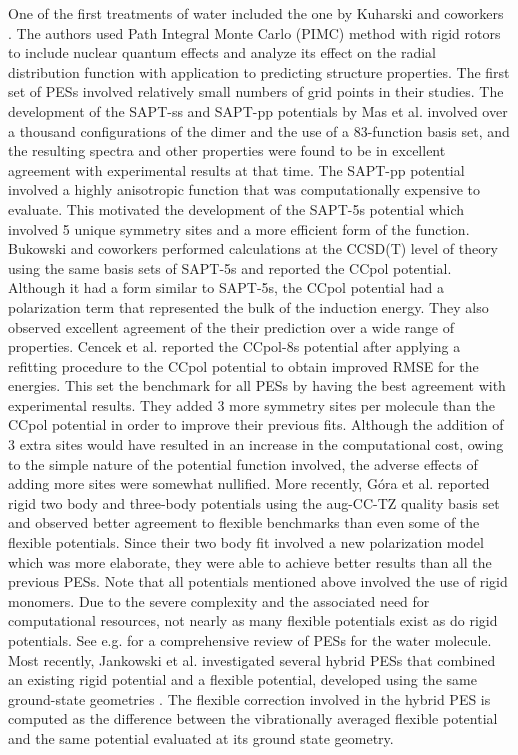         One of the first \abinitio{} treatments of water included the one by Kuharski and coworkers \cite{Kuharski1984,Kuharski1985}. The authors used Path Integral Monte Carlo (PIMC) method with rigid rotors to include nuclear quantum effects and analyze its effect on the radial distribution function with application to predicting structure properties. The first set of \abinitio{} PESs \cite{Popkie1973,Matsuoka1976,Niesar1989,Niesar1990,Corongiu1992,Millot1992,Millot1998} involved relatively small numbers of grid points in their studies. The development of the SAPT-ss and SAPT-pp potentials by Mas et al. \cite{Mas1997} involved over a thousand configurations of the dimer and the use of a 83-function basis set, and the resulting spectra and other properties were found to be in excellent agreement with experimental results at that time. The SAPT-pp potential involved a highly anisotropic function that was computationally expensive to evaluate. This motivated the development of the SAPT-5s potential which involved 5 unique symmetry sites and a more efficient form of the function. Bukowski and coworkers \cite{Bukowski2007,Bukowski2008a,Bukowski2008b} performed calculations at the CCSD(T) level of theory using the same basis sets of SAPT-5s and reported the CCpol potential. Although it had a form similar to SAPT-5s, the CCpol potential had a polarization term that represented the bulk of the induction energy. They also observed excellent agreement of the their prediction over a wide range of properties. Cencek et al. \cite{Cencek2008} reported the CCpol-8s potential after applying a refitting procedure to the CCpol potential to obtain improved RMSE for the \abinitio{} energies. This set the benchmark for all \abinitio{} PESs by having the best agreement with experimental results. They added 3 more symmetry sites per molecule than the CCpol potential in order to improve their previous fits. Although the addition of 3 extra sites would have resulted in an increase in the computational cost, owing to the simple nature of the potential function involved, the adverse effects of adding more sites were somewhat nullified. More recently, G\'{o}ra et al. \cite{Gora2014} reported rigid two body and three-body potentials using the aug-CC-TZ quality basis set and observed better agreement to flexible benchmarks than even some of the flexible potentials. Since their two body fit involved a new polarization model which was more elaborate, they were able to achieve better results than all the previous PESs. Note that all potentials mentioned above involved the use of rigid monomers. Due to the severe complexity and the associated need for computational resources, not nearly as many flexible \abinitio{} potentials  exist as do rigid potentials. See e.g. \cite{Szalewicz2009} for a comprehensive review of PESs for the water molecule. Most recently, Jankowski et al.\cite{Jankowski2015} investigated several hybrid PESs that combined an existing rigid potential and a flexible potential, developed using the same ground-state geometries \cite{Leforestier2002}. The flexible correction involved in the hybrid PES is computed as the difference between the vibrationally averaged flexible potential and the same potential evaluated at its ground state geometry.

